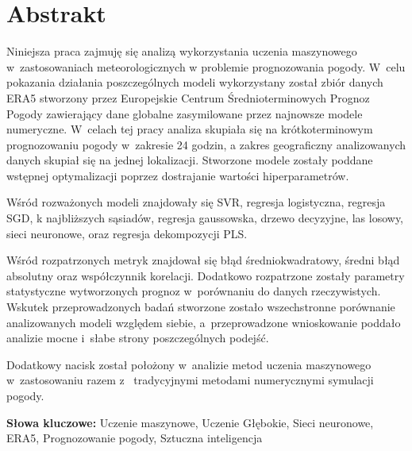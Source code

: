 \documentclass{article}
\begin{document}

\begin{titlepage}
    
\end{titlepage}

\tableofcontents
\pagebreak

\section*{Abstrakt}

Niniejsza praca zajmuję się analizą wykorzystania uczenia maszynowego w~zastosowaniach meteorologicznych
w problemie prognozowania pogody. W~celu pokazania działania poszczególnych modeli wykorzystany został
zbiór danych ERA5 stworzony przez Europejskie Centrum Średnioterminowych Prognoz Pogody zawierający
dane globalne zasymilowane przez najnowsze modele numeryczne. W~celach tej pracy analiza skupiała 
się na krótkoterminowym prognozowaniu pogody w~zakresie 24 godzin,
a zakres geograficzny analizowanych danych skupiał się na jednej lokalizacji. 
Stworzone modele zostały poddane wstępnej optymalizacji poprzez dostrajanie wartości hiperparametrów.

Wśród rozważonych modeli znajdowały się SVR, regresja logistyczna, regresja SGD,
k najbliższych sąsiadów, regresja gaussowska, drzewo decyzyjne, las losowy, sieci neuronowe,
oraz regresja dekompozycji PLS.

Wśród rozpatrzonych metryk znajdował się błąd średniokwadratowy, średni błąd absolutny oraz współczynnik
korelacji. Dodatkowo rozpatrzone zostały parametry statystyczne wytworzonych prognoz w~porównaniu
do danych rzeczywistych. Wskutek przeprowadzonych badań stworzone zostało wszechstronne porównanie
analizowanych modeli względem siebie, a~przeprowadzone wnioskowanie poddało analizie 
mocne i~słabe strony poszczególnych podejść.

Dodatkowy nacisk został położony w~analizie metod uczenia maszynowego w~zastosowaniu razem z~
tradycyjnymi metodami numerycznymi symulacji pogody. 

\bigskip

\noindent
{\bf Słowa kluczowe:} Uczenie maszynowe, Uczenie Głębokie, Sieci neuronowe,
ERA5, Prognozowanie pogody, Sztuczna inteligencja
\pagebreak



% 



% 

\end{document}
